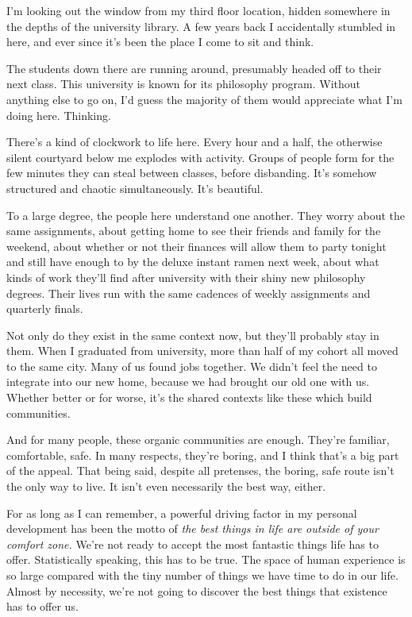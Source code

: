 \documentclass[]{book}
\begin{document}
 I'm looking out the window from my third floor
location, hidden somewhere in the depths of the university library. A few years
back I accidentally stumbled in here, and ever since it's been the place I come
to sit and think.

The students down there are running around, presumably headed off to their next
class. This university is known for its philosophy program. Without anything
else to go on, I'd guess the majority of them would appreciate what I'm doing
here. Thinking.

There's a kind of clockwork to life here. Every hour and a half, the otherwise
silent courtyard below me explodes with activity. Groups of people form for the
few minutes they can steal between classes, before disbanding. It's somehow
structured and chaotic simultaneously. It's beautiful.

To a large degree, the people here understand one another. They worry about the
same assignments, about getting home to see their friends and family for the
weekend, about whether or not their finances will allow them to party tonight
and still have enough to by the deluxe instant ramen next week, about what kinds
of work they'll find after university with their shiny new philosophy degrees.
Their lives run with the same cadences of weekly assignments and quarterly
finals.

Not only do they exist in the same context now, but they'll probably stay in
them. When I graduated from university, more than half of my cohort all moved to
the same city. Many of us found jobs together. We didn't feel the need to
integrate into our new home, because we had brought our old one with us. Whether
better or for worse, it's the shared contexts like these which build
communities.

And for many people, these organic communities are enough. They're familiar,
comfortable, safe. In many respects, they're boring, and I think that's a big
part of the appeal. That being said, despite all pretenses, the boring, safe
route isn't the only way to live. It isn't even necessarily the best way,
either.

For as long as I can remember, a powerful driving factor in my personal
development has been the motto of \emph{the best things in life are outside of
your comfort zone.} We're not ready to accept the most fantastic things life has
to offer. Statistically speaking, this has to be true. The space of human
experience is so large compared with the tiny number of things we have time to
do in our life.  Almost by necessity, we're not going to discover the best
things that existence has to offer us.
\end{document}
